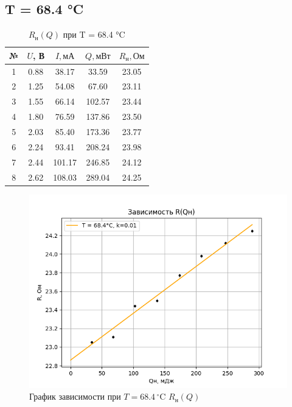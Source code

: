 \documentclass[a4paper, 10pt, twocolumn]{article}
\begin{document}
    \subsection{T = 68.4 °C}
    \begin{table}[H]
        \centering
        \begin{tabular}{|c|c|c|c|c|} \hline
        № & $U$, В & $I, \text{мА}$ & $ Q, \text{мВт} $ & $R_\text{н}, \text{Ом}$ \\ \hline
        1 & 0.88 & 38.17  & 33.59  & 23.05 \\ \hline
        2 & 1.25 & 54.08  & 67.60  & 23.11 \\ \hline
        3 & 1.55 & 66.14  & 102.57 & 23.44 \\ \hline
        4 & 1.80 & 76.59  & 137.86 & 23.50 \\ \hline
        5 & 2.03 & 85.40  & 173.36 & 23.77 \\ \hline
        6 & 2.24 & 93.41  & 208.24 & 23.98 \\ \hline
        7 & 2.44 & 101.17 & 246.85 & 24.12 \\ \hline
        8 & 2.62 & 108.03 & 289.04 & 24.25 \\ \hline
        \end{tabular}
        \caption{$R_\text{н}(Q)$ при T = 68.4 °C}
    \end{table}
    \begin{figure}[H]
        \centering
        \includegraphics[width=1\linewidth]{graphs/figure5.png}
        \begin{center}
            \caption{График зависимости при $T =68.4 \, ^\circ\text{C}$ $R_\text{н}(Q)$}
        \end{center}
    \end{figure}
\end{document}
